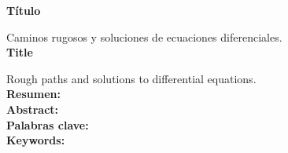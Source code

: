 
\textbf{Título} 

Caminos rugosos y soluciones de ecuaciones diferenciales.\\

\textbf{Title}

Rough paths and solutions to differential equations. \\

\textbf{Resumen: }  \\

\textbf{Abstract: } \\

\textbf{Palabras clave:} \\

\textbf{Keywords:} \\ 


